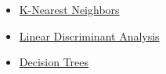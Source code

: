 \documentclass[11pt]{article}
\begin{document}
\begin{itemize}
\item \href{https://www.youtube.com/watch?v=HVXime0nQeI}{K-Nearest Neighbors}
\item \href{https://www.youtube.com/watch?v=azXCzI57Yfc}{Linear Discriminant Analysis}
\item \href{https://www.youtube.com/watch?v=7VeUPuFGJHk}{Decision Trees}
\end{itemize}
\end{document}
